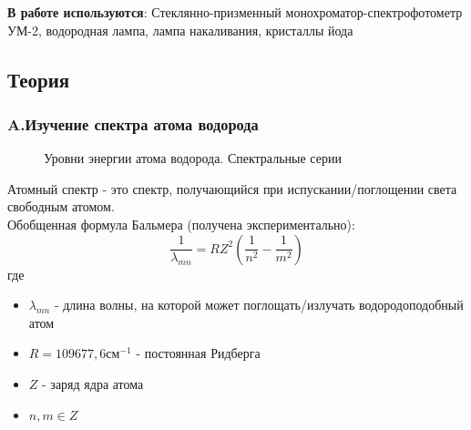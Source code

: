 \documentclass[a4paper,12pt]{article} %
\begin{document}
\textbf{В работе используются}: Стеклянно-призменный монохроматор-спектрофотометр УМ-2, водородная лампа, лампа накаливания, кристаллы йода




\subsection*{Теория}
\subsubsection*{A.Изучение спектра атома водорода}
\begin{figure} 
\caption{Уровни энергии атома водорода. Спектральные серии}
\label{fig:image}
\end{figure}

Атомный спектр - это спектр, получающийся при испускании/поглощении света свободным атомом. \\


Обобщенная формула Бальмера (получена экспериментально):
\begin{equation}
    \frac{1}{\lambda_{mn}} = RZ^2(\frac{1}{n^2} - \frac{1}{m^2})
\end{equation} где
\begin{itemize}
    \item $\lambda_{mn}$ - длина волны, на которой может поглощать/излучать водородоподобный атом
    \item $R = 109677,6 \text{см}^{-1}$ - постоянная Ридберга
    \item $Z$ - заряд ядра атома
    \item $n, m \in Z$
\end{itemize}
\end{document}
